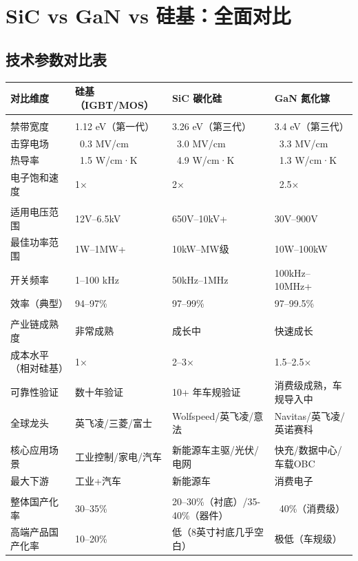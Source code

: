 \section{SiC vs GaN vs 硅基：全面对比}

\subsection{技术参数对比表}

\begin{exhibitbox}[表 4-2：三大技术路线全方位对比]
\centering
\small
\setlength{\tabcolsep}{4pt}
\begin{tabularx}{\textwidth}{L{2.8cm} L{2.5cm} L{2.5cm} X}
\toprule
\textbf{对比维度} & \textbf{硅基（IGBT/MOS）} & \textbf{SiC 碳化硅} & \textbf{GaN 氮化镓} \\
\midrule
{}
 \\
禁带宽度 & 1.12 eV（第一代） & 3.26 eV（第三代） & 3.4 eV（第三代） \\
击穿电场 & ~0.3 MV/cm & ~3.0 MV/cm & ~3.3 MV/cm \\
热导率 & ~1.5 W/cm·K & ~4.9 W/cm·K & ~1.3 W/cm·K \\
电子饱和速度 & 1× & 2× & ~2.5× \\
\midrule
{}
 \\
适用电压范围 & 12V–6.5kV & 650V–10kV+ & 30V–900V \\
最佳功率范围 & 1W–1MW+ & 10kW–MW级 & 10W–100kW \\
开关频率 & 1–100 kHz & 50kHz–1MHz & 100kHz–10MHz+ \\
效率（典型） & 94–97\% & 97–99\% & 97–99.5\% \\
\midrule
{}
 \\
产业链成熟度 & \textcolor{riskgreen}{非常成熟} & \textcolor{riskamber}{成长中} & \textcolor{riskamber}{快速成长} \\
成本水平（相对硅基） & 1× & 2–3× & 1.5–2.5× \\
可靠性验证 & 数十年验证 & 10+ 年车规验证 & 消费级成熟，车规导入中 \\
全球龙头 & 英飞凌/三菱/富士 & Wolfspeed/英飞凌/意法 & Navitas/英飞凌/英诺赛科 \\
\midrule
{}
 \\
核心应用场景 & 工业控制/家电/汽车 & 新能源车主驱/光伏/电网 & 快充/数据中心/车载OBC \\
最大下游 & 工业+汽车 & 新能源车 & 消费电子 \\
\midrule
{}
 \\
整体国产化率 & 30–35\% & 20–30\%（衬底）/35-40\%（器件） & ~40\%（消费级） \\
高端产品国产化率 & 10–20\% & 低（8英寸衬底几乎空白） & 极低（车规级） \\
\bottomrule
\end{tabularx}
\end{exhibitbox}

